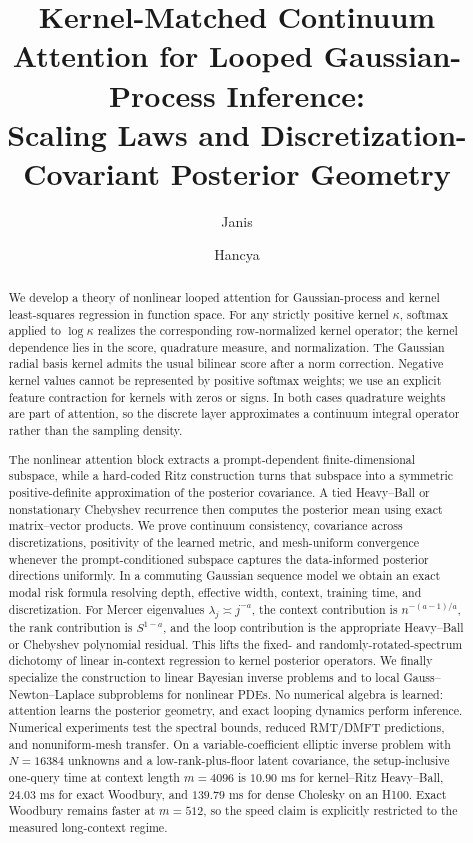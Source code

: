 \documentclass[11pt,a4paper]{article}
\title{Kernel-Matched Continuum Attention for Looped Gaussian-Process Inference:\\
Scaling Laws and Discretization-Covariant Posterior Geometry}
\author{Janis \and Hancya}
\date{}
\numberwithin{equation}{section}
\theoremstyle{definition}
\theoremstyle{remark}
\begin{document}
\maketitle

\begin{abstract}
We develop a theory of nonlinear looped attention for Gaussian-process and
kernel least-squares regression in function space. For any strictly positive
kernel \(\kappa\), softmax applied to \(\log\kappa\) realizes the corresponding
row-normalized kernel operator; the kernel dependence lies in the score,
quadrature measure, and normalization. The Gaussian radial basis kernel
admits the usual bilinear score after a norm correction. Negative kernel
values cannot be represented by positive softmax weights; we use an explicit
feature contraction for kernels with zeros or signs. In both cases quadrature
weights are part of attention, so the discrete layer
approximates a continuum integral operator rather than the sampling density.

The nonlinear attention block extracts a prompt-dependent finite-dimensional
subspace, while a hard-coded Ritz construction turns that subspace into a
symmetric positive-definite approximation of the posterior covariance.  A
tied Heavy--Ball or nonstationary Chebyshev recurrence then computes the
posterior mean using exact matrix--vector products.  We prove continuum
consistency, covariance across discretizations, positivity of the learned
metric, and mesh-uniform convergence whenever the prompt-conditioned subspace
captures the data-informed posterior directions uniformly.  In a commuting
Gaussian sequence model we obtain an exact modal risk formula resolving
depth, effective width, context, training time, and discretization.  For
Mercer eigenvalues $\lambda_j\asymp j^{-a}$, the context contribution is
$n^{-(a-1)/a}$, the rank contribution is $S^{1-a}$, and the loop contribution
is the appropriate Heavy--Ball or Chebyshev polynomial residual.  This lifts
the fixed- and randomly-rotated-spectrum dichotomy of linear in-context
regression to kernel posterior operators.  We finally specialize the
construction to linear Bayesian inverse problems and to local
Gauss--Newton--Laplace subproblems for nonlinear PDEs.  No numerical algebra is
learned: attention learns the posterior geometry, and exact looping dynamics
perform inference. Numerical experiments test the spectral bounds, reduced
RMT/DMFT predictions, and nonuniform-mesh transfer. On a
variable-coefficient elliptic inverse problem with
$N=16384$ unknowns and a low-rank-plus-floor latent covariance, the
setup-inclusive one-query time at context length $m=4096$ is $10.90$ ms for
kernel--Ritz Heavy--Ball, $24.03$ ms for exact Woodbury, and $139.79$ ms for
dense Cholesky on an H100.  Exact Woodbury remains faster at $m=512$, so the
speed claim is explicitly restricted to the measured long-context regime.
\end{abstract}
\end{document}
